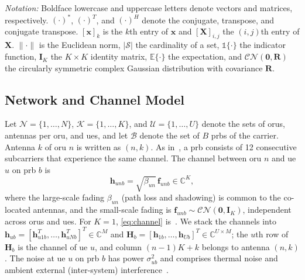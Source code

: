 \documentclass[10pt, final, journal, letterpaper, twocolumn]{IEEEtran}
\newcommand{\Nset}{\mathcal{N}}
\newcommand{\Kset}{\mathcal{K}}
\newcommand{\Uset}{\mathcal{U}}
\newcommand{\Bset}{\mathcal{B}}
\newcommand{\CN}{\mathcal{CN}}
\newcommand{\E}{\mathbb{E}}
\newcommand{\bh}{\mathbf{h}}
\newcommand{\bH}{\mathbf{H}}
\newcommand{\ind}{\mathbb{1}}
\begin{document}
\textit{Notation:} Boldface lowercase and uppercase letters denote vectors and matrices, respectively. $(\cdot)^*$, $(\cdot)^T$, and $(\cdot)^H$ denote the conjugate, transpose, and conjugate transpose. $[\mathbf{x}]_k$ is the $k$th entry of $\mathbf{x}$ and $[\mathbf{X}]_{i,j}$ the $(i,j)$th entry of $\mathbf{X}$. $\|\cdot\|$ is the Euclidean norm, $|\mathcal{S}|$ the cardinality of a set, $\ind\{\cdot\}$ the indicator function, $\mathbf{I}_K$ the $K \times K$ identity matrix, $\E\{\cdot\}$ the expectation, and $\CN(\mathbf{0}, \mathbf{R})$ the circularly symmetric complex Gaussian distribution with covariance $\mathbf{R}$.

\subsection{Network and Channel Model}\label{sec:channel}

Let $\Nset = \{1, \dots, N\}$, $\Kset = \{1, \dots, K\}$, and $\Uset = \{1, \dots, U\}$ denote the sets of \glspl{oru}, antennas per \gls{oru}, and \glspl{ue}, and let $\Bset$ denote the set of $B$ \glspl{prb} of the carrier. Antenna $k$ of \gls{oru} $n$ is written as $(n, k)$. As in~\cite{girycki2024twc}, a \gls{prb} consists of 12 consecutive subcarriers that experience the same channel. The channel between \gls{oru} $n$ and \gls{ue} $u$ on \gls{prb} $b$ is
\begin{equation}
  \bh_{unb} = \sqrt{\beta_{un}}\, \mathbf{f}_{unb} \in \mathbb{C}^{K},
  \label{eq:channel}
\end{equation}
where the large-scale fading $\beta_{un}$ (path loss and shadowing) is common to the co-located antennas, and the small-scale fading is $\mathbf{f}_{unb} \sim \CN(\mathbf{0}, \mathbf{I}_K)$, independent across \glspl{oru} and \glspl{ue}. For $K = 1$, \eqref{eq:channel} is~\cite[eq.~(2)]{girycki2024twc}. We stack the channels into $\bh_{ub} = [\bh_{u1b}^T, \dots, \bh_{uNb}^T]^T \in \mathbb{C}^{M}$ and $\bH_b = [\bh_{1b}, \dots, \bh_{Ub}]^T \in \mathbb{C}^{U \times M}$; the $u$th row of $\bH_b$ is the channel of \gls{ue} $u$, and column $(n-1)K + k$ belongs to antenna $(n,k)$. The noise at \gls{ue} $u$ on \gls{prb} $b$ has power $\sigma_{ub}^2$ and comprises thermal noise and ambient external (inter-system) interference~\cite{girycki2024eucnc,girycki2024twc}.
\end{document}

